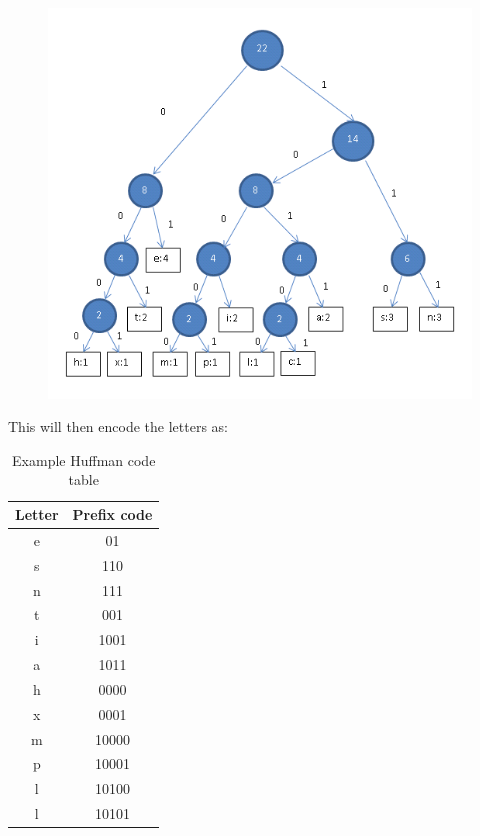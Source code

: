 \begin{figure}[H]
        \centering
        \includegraphics[width=1.00\textwidth]{figures/huffmanTree1.png}
        \label{fig:hufftree1}
\end{figure}

This will then encode the letters as:

\begin{table}[H]
\begin{tabular}{| c | c |}
\hline
\textbf{Letter} & \textbf{Prefix code} \\ \hline \hline
e & 01 \\ \hline
s & 110 \\ \hline
n & 111 \\ \hline
t & 001 \\ \hline
i & 1001 \\ \hline
a & 1011 \\ \hline
h & 0000 \\ \hline
x & 0001 \\ \hline
m & 10000 \\ \hline
p & 10001 \\ \hline
l & 10100 \\ \hline
l & 10101 \\ \hline
\end{tabular}
\caption{Example Huffman code table}
\label{tab:huff1}
\end{table}

